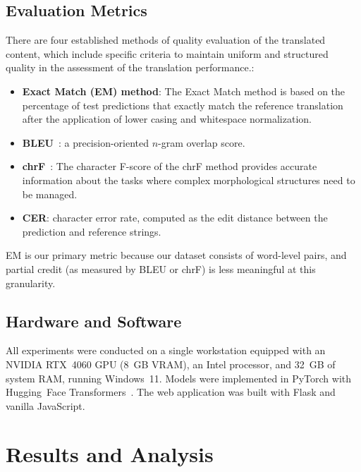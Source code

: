 \documentclass[conference]{IEEEtran}
\begin{document}
\subsection{Evaluation Metrics}

There are four established methods of quality evaluation of the translated content, which include specific criteria to maintain uniform and structured quality in the assessment of the translation performance.:

\begin{itemize}
    \item \textbf{Exact Match (EM) method}: The Exact Match method is based on the percentage of test predictions that exactly match the reference translation after the application of lower casing and whitespace normalization.
    \item \textbf{BLEU}~\cite{papineni2002bleu}: a precision-oriented $n$-gram overlap score.
    \item \textbf{chrF}~\cite{popovic2015chrf}: The character F-score of the chrF method provides accurate information about the tasks where complex morphological structures need to be managed.
    \item \textbf{CER}: character error rate, computed as the edit distance between the prediction and reference strings.
\end{itemize}

EM is our primary metric because our dataset consists of word-level pairs, and partial credit (as measured by BLEU or chrF) is less meaningful at this granularity.

\subsection{Hardware and Software}

All experiments were conducted on a single workstation equipped with an NVIDIA RTX~4060 GPU (8~GB VRAM), an Intel processor, and 32~GB of system RAM, running Windows~11. Models were implemented in PyTorch with Hugging~Face Transformers~\cite{wolf2020huggingface}. The web application was built with Flask and vanilla JavaScript.

\section{Results and Analysis}\label{sec:results}
\end{document}
